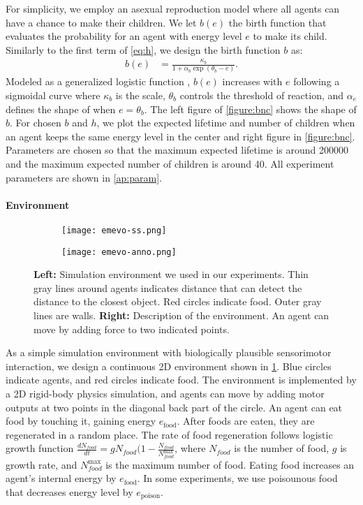 For simplicity, we employ an asexual reproduction model where all agents can have a chance to make their children. We let $b(e)$ the birth function that evaluates the probability for an agent with energy level $e$ to make its child. Similarly to the first term of \cref{eq:h}, we design the birth function $b$ as:
\begin{align}
 b(e) &=  \frac{\kappa_{b}}{1 + \alpha_{b}\exp(\theta_{b} - e)}. \label{eq:b}
\end{align}
Modeled as a generalized logistic function \citep{richardsFlexibleGrowthFunction1959}, $b(e)$ increases with $e$ following a sigmoidal curve where $\kappa_{b}$ is the scale, $\theta_{b}$ controls the threshold of reaction, and $\alpha_{e}$ defines the shape of when $e = \theta_{b}$. The left figure of \cref{figure:bnc} shows the shape of $b$. For chosen $b$ and $h$, we plot the expected lifetime and number of children when an agent keeps the same energy level in the center and right figure in \cref{figure:bnc}. Parameters are chosen so that the maximum expected lifetime is around \num{200000} and the maximum expected number of children is around 40. All experiment parameters are shown in \cref{ap:param}.

\paragraph{Environment}

\begin{figure}[t]
  \begin{subfigure}[t]{6cm}
    \centering
    \texttt{[image: emevo-ss.png]}
  \end{subfigure}
  \begin{subfigure}[t]{8cm}
    \centering
    \texttt{[image: emevo-anno.png]}
  \end{subfigure}
  \caption{
    \textbf{Left:} Simulation environment we used in our experiments. Thin gray lines around agents indicates distance that can detect the distance to the closest object. Red circles indicate food. Outer gray lines are walls.
    \textbf{Right:} Description of the environment. An agent can move by adding force to two indicated points.
  }\label{figure:env}
\end{figure}

As a simple simulation environment with biologically plausible sensorimotor interaction, we design a continuous 2D environment shown in \cref{figure:env}. Blue circles indicate agents, and red circles indicate food. The environment is implemented by a 2D rigid-body physics simulation, and agents can move by adding motor outputs at two points in the diagonal back part of the circle. An agent can eat food by touching it, gaining energy $e_{\mathrm{food}}$. After foods are eaten, they are regenerated in a random place. The rate of food regeneration follows logistic growth function $\frac{dN_{food}}{dt} = g N_{food} (1 - \frac{N_{food}}{N_{food}^{\mathrm{max}}}$, where $N_{food}$ is the number of food, $g$ is growth rate, and $N_{food}^{\mathrm{max}}$ is the maximum number of food. Eating food increases an agent's internal energy by $e_{\mathrm{food}}$. In some experiments, we use poisounous food that decreases energy level by $e_{\mathrm{poison}}$.

